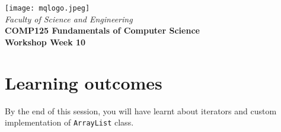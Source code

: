\usepackage[T1]{fontenc}
\usepackage{pslatex}
 \usepackage[pdftex]{color}  
 \usepackage[pdftex]{graphicx}     
\usepackage{verbatim}
\usepackage{xcolor}
\usepackage{paralist}
\usepackage{tagging}

\usepackage[colorlinks=true,urlcolor=red]{hyperref}
\setlength{\topmargin}{-0.5in}                  %
\setlength{\textheight}{9.5in}                  %
\setlength{\oddsidemargin}{0in}                 %
\setlength{\evensidemargin}{0in}                %
\setlength{\textwidth}{6.5in}                   %
\setlength{\parindent}{0.0in}
\newcommand{\code}{\texttt}






%
\vspace{0.2in}
\begin{center}
        {\large  %
\texttt{[image: mqlogo.jpeg]}\\
\medskip
        {\it  Faculty of Science and Engineering\\}
        \vspace{0.2in}
         {\bf COMP125 Fundamentals of Computer Science\\
        Workshop Week 10\\}}
\end{center}
\vspace{0.3in}
%

\renewcommand{\labelenumi}{\alph{enumi}.}
 
\section* {Learning outcomes}

By the end of this session, you will have learnt about iterators and custom implementation of \texttt{ArrayList} class. 

